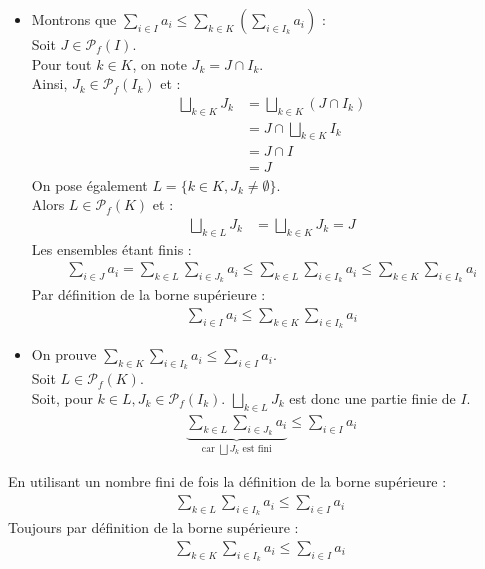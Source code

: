 \documentclass[../main.tex]{subfiles}
\begin{document}
\begin{itemize}
    \item Montrons que $\sum\limits_{i\in I} a_i\leq \sum\limits_{k\in K}\left(\sum\limits_{i\in I_k} a_i\right)$ : \\
    Soit $J\in \mathcal{P}_f(I)$. \\
    Pour tout $k\in K$, on note $J_k = J\cap I_k$. \\
    Ainsi, $J_k\in \mathcal{P}_f(I_k)$ et :
    \begin{align*}
        \bigsqcup_{k\in K} J_k &= \bigsqcup_{k\in K} (J\cap I_k) \\
        &= J\cap \bigsqcup_{k\in K} I_k \\
        &= J\cap I \\
        &= J
    \end{align*}
    On pose également $L = \{k\in K, J_k\neq\emptyset \}$. \\
    Alors $L\in \mathcal{P}_f(K)$ et :
    \begin{align*}
        \bigsqcup_{k\in L} J_k &= \bigsqcup_{k\in K} J_k = J
    \end{align*}
    Les ensembles étant finis :
    \begin{align*}
        \sum_{i\in J} a_i = \sum_{k\in L} \sum_{i\in J_k} a_i\leq \sum_{k\in L}\sum_{i\in I_k} a_i \leq \sum_{k\in K} \sum_{i\in I_k} a_i
    \end{align*}
    Par définition de la borne supérieure : 
    \begin{align*}
        \sum_{i\in I} a_i \leq \sum_{k\in K}\sum_{i\in I_k} a_i
    \end{align*}

    \item On prouve $\sum\limits_{k\in K}\sum\limits_{i\in I_k} a_i\leq \sum\limits_{i\in I} a_i$. \\
    Soit $L\in \mathcal{P}_f(K)$. \\
    Soit, pour $k\in L, J_k\in \mathcal{P}_f(I_k)$. 
    $\bigsqcup_{k\in L} J_k$ est donc une partie finie de $I$. \\
    \begin{align*}
        \underbrace{\sum_{k\in L}\sum_{i\in J_k} a_i}_{\text{car } \bigsqcup J_k \text{ est fini}} \leq \sum_{i\in I} a_i
    \end{align*}
\end{itemize}
En utilisant un nombre fini de fois la définition de la borne supérieure : 
\begin{align*}
    \sum_{k\in L}\sum_{i\in I_k} a_i \leq \sum_{i\in I} a_i
\end{align*}
Toujours par définition de la borne supérieure : 
\begin{align*}
    \sum_{k\in K}\sum_{i\in I_k} a_i \leq \sum_{i\in I} a_i 
\end{align*}
\end{document}

